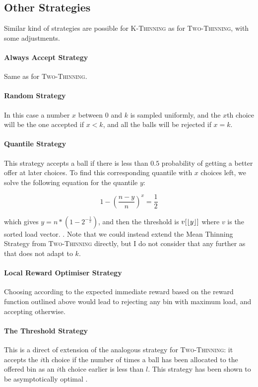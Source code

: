 \subsection{Other Strategies}

Similar kind of strategies are possible for \textsc{K-Thinning} as for \textsc{Two-Thinning}, with some adjustments.

\paragraph{Always Accept Strategy} Same as for \textsc{Two-Thinning}.


\paragraph{Random Strategy} In this case a number $x$ between $0$ and $k$ is sampled uniformly, and the $x$th choice will be the one accepted if $x<k$, and all the balls will be rejected if $x=k$.



\paragraph{Quantile Strategy} This strategy accepts a ball if there is less than $0.5$ probability of getting a better offer at later choices. To find this corresponding quantile with $x$ choices left, we solve the following equation for the quantile $y$:

\begin{equation} \label{meankthinning}
1 - (\frac{n-y}{n})^x = \frac{1}{2}
\end{equation}

which gives $y = n * (1 - 2^{-\frac{1}{x}})$, and then the threshold is $v[\lfloor y\rfloor]$ where $v$ is the sorted load vector. . Note that we could instead extend the Mean Thinning Strategy from \textsc{Two-Thinning} directly, but I do not consider that any further as that does not adapt to $k$.


\paragraph{Local Reward Optimiser Strategy} Choosing according to the expected immediate reward based on the reward function outlined above would lead to rejecting any bin with maximum load, and accepting otherwise.


\paragraph{The Threshold Strategy} This is a direct of extension of the analogous strategy for \textsc{Two-Thinning}: it accepts the $i$th choice if the number of times a ball has been allocated to the offered bin as an $i$th choice earlier is less than $l$. This strategy has been shown to be asymptotically optimal \cite{feldheim2020dthinning}.


